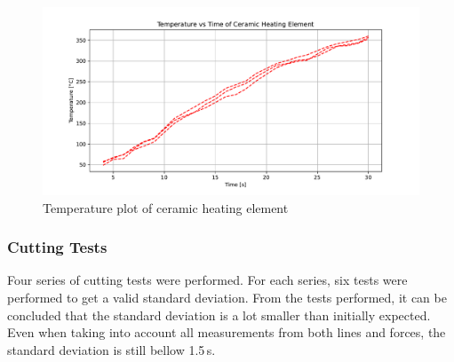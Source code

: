 \begin{figure}[h!]
	\centering
	\includegraphics[width=\textwidth]{plots/temperature}
	\caption{Temperature plot of ceramic heating element}
	\label{fig:temperature}
\end{figure}

\subsubsection{Cutting Tests}
Four series of cutting tests were performed. For each series, six tests were performed to get a valid standard deviation. From the tests performed, it can be concluded that the standard deviation is a lot smaller than initially expected. Even when taking into account all measurements from both lines and forces, the standard deviation is still bellow 1.5\,s. 

